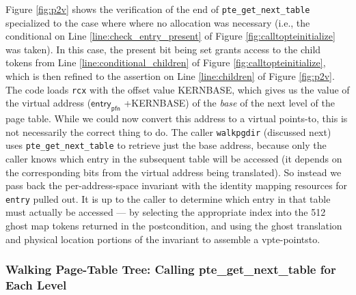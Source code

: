 Figure \ref{fig:p2v} shows the verification of the end of \lstinline|pte_get_next_table| specialized to the case where 
where no allocation was necessary (i.e., the conditional on Line \ref{line:check_entry_present} of Figure \ref{fig:calltopteinitialize} was taken).
In this case, the present bit being set grants access to the child tokens from Line \ref{line:conditional_children} of Figure \ref{fig:calltopteinitialize},
which is then refined to the assertion on Line \ref{line:children} of Figure \ref{fig:p2v}.
The code loads \lstinline|rcx| with the offset value \textsf{KERNBASE}, which gives us the value of the virtual address ($\textsf{entry}_{\textsf{pfn}}$ \textsf{+KERNBASE})
of the \emph{base} of the next level of the page table.
While we could now convert this address to a virtual points-to, this is not necessarily the correct thing to do.
The caller \lstinline|walkpgdir| (discussed next) uses \lstinline|pte_get_next_table| to retrieve just the base address,
because only the caller knows which entry in the subsequent table will be accessed (it depends on the corresponding bits from the virtual
address being translated). So instead we pass back the per-address-space invariant with the identity mapping resources for \lstinline|entry|
pulled out. It is up to the caller to determine which entry in that table must actually
be accessed --- by selecting the appropriate index into the 512 ghost map tokens returned in the postcondition,
and using the ghost translation and physical location portions of the invariant to assemble a vpte-pointsto.



\subsubsection{Walking Page-Table Tree: Calling \textsf{pte\_get\_next\_table} for Each Level}
\label{wlkpgdir}

